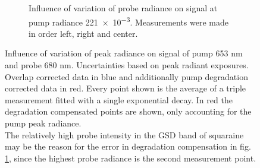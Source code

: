 \documentclass[twoside,openright]{scrreprt}
\begin{document}
\begin{figure}[hbtp]
\begin{subfigure}[t]{0.5\linewidth}
\caption{Influence of variation of probe radiance on signal at pump radiance \SI{221e-3}{\radExp}. Measurements were made in order left, right and center.\label{fig:PowerVarProbe}}
\end{subfigure}
\caption{Influence of variation of peak radiance on signal of pump 653 nm and probe 680 nm. Uncertainties based on peak radiant exposures.
Overlap corrected data in blue and additionally pump degradation corrected data in red. Every point shown is the average of a triple measurement fitted with a single exponential decay. In red the degradation compensated points are shown, only accounting for the pump peak radiance.\\ The relatively high probe intensity in the GSD band of squaraine  may be the reason for the error in degradation compensation in fig. \ref{fig:PowerVarProbe}, since the highest probe radiance is the second measurement point. \label{fig:PowerVarRaw}}
\end{figure}
\end{document}
